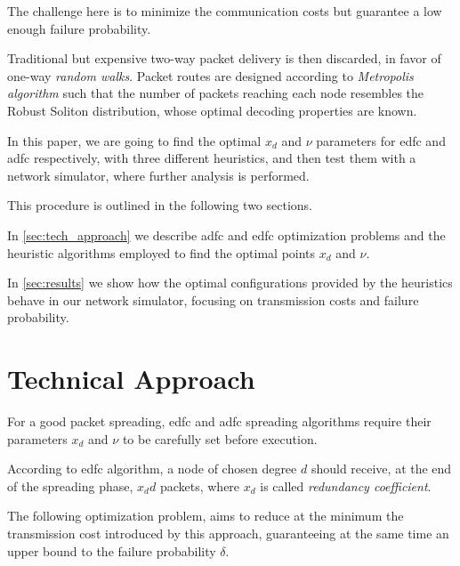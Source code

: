 \documentclass[12pt,journal,draftclsnofoot,onecolumn]{IEEEtran}
\begin{document}
The challenge here is to minimize the communication costs but guarantee a low enough failure probability.

Traditional but expensive \mbox{two-way} packet delivery is then discarded, in favor of \mbox{one-way} \emph{random walks}.
Packet routes are designed according to \emph{Metropolis algorithm} such that the number of packets reaching each node resembles the Robust Soliton distribution, whose optimal decoding properties are known\cite{Luby}.

In this paper, we are going to find the optimal $x_d$ and $\nu$ parameters for \gls{edfc} and \gls{adfc} respectively, with three different heuristics, and then test them with a network simulator, where further analysis is performed.

\smallbreak
This procedure is outlined in the following two sections.

In \autoref{sec:tech_approach} we describe \gls{adfc} and \gls{edfc} optimization problems and the heuristic algorithms employed to find the optimal points $x_d$ and $\nu$.

In \autoref{sec:results} we show how the optimal configurations provided by the heuristics behave in our network simulator, focusing on transmission costs and failure probability.

\section{Technical Approach}
\label{sec:tech_approach}
For a good packet spreading, \gls{edfc} and \gls{adfc} spreading algorithms require their parameters $x_d$ and $\nu$ to be carefully set before execution.

\smallbreak
According to \gls{edfc} algorithm, a node of chosen degree $d$ should receive, at the end of the spreading phase, $x_d d$ packets, where $x_d$ is called \emph{redundancy coefficient}.

The following optimization problem, aims to reduce at the minimum the transmission cost introduced by this approach, guaranteeing at the same time an upper bound to the failure probability $\delta$.\cite{Lin2007}
\end{document}
